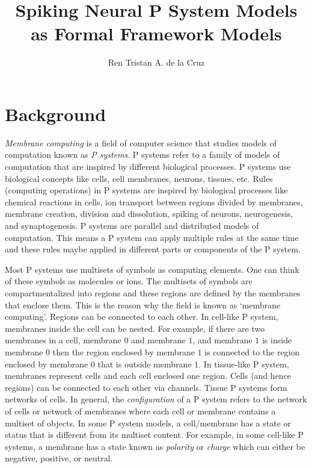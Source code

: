 \documentclass[a4paper]{article}
\theoremstyle{definition}
\begin{document}
\title
{
   Spiking Neural P System Models\\ as Formal Framework Models
}


\author
{
   Ren Tristan A. de la Cruz
}


\maketitle


\section{Background}

\emph{Membrane computing} is a field of computer science that studies models of computation known as
\emph{P systems}. P systems refer to a family of models of computation that are inspired by 
different biological processes. P systems use biological concepts like cells, cell membranes, 
neurons, tissues, etc. Rules (computing operations) in P systems are inspired by biological 
processes like chemical reactions in cells, ion transport between regions divided by membranes, 
membrane creation, division and dissolution, spiking of neurons, neurogenesis, and synaptogenesis. 
P systems are parallel and distributed models of computation. This means a P system can apply 
multiple rules at the same time and these rules maybe applied in different parts or components of
the P
system. 

Most P systems use multisets of symbols as computing elements. One can think of these symbols as 
molecules or ions. The multisets of symbols are compartmentalized into regions and these regions are 
defined by the membranes that enclose them. This is the reason why the field is known as `membrane
computing'. Regions can be connected to each other. In cell-like P system, membranes inside the cell 
can be nested. For example, if there are two membranes in a cell, membrane $0$ and membrane $1$, and 
membrane $1$ is inside membrane $0$ then the region enclosed by membrane $1$ is connected to the 
region enclosed by membrane $0$ that is outside membrane $1$. In tissue-like P system, membranes 
represent cells and each cell enclosed one region. Cells (and hence regions) can be connected to 
each other via channels. Tissue P systems form networks of cells. In general, the 
\emph{configuration} of a P system refers to the network of cells or network of membranes where each
cell or membrane contains a multiset of objects. In some P system models, a cell/membrane has a
state or status that is different from its multiset content. For example, in some cell-like P 
systems, a membrane has a state known as \emph{polarity} or \emph{charge} which can either be 
negative, positive, or neutral.
\end{document}
